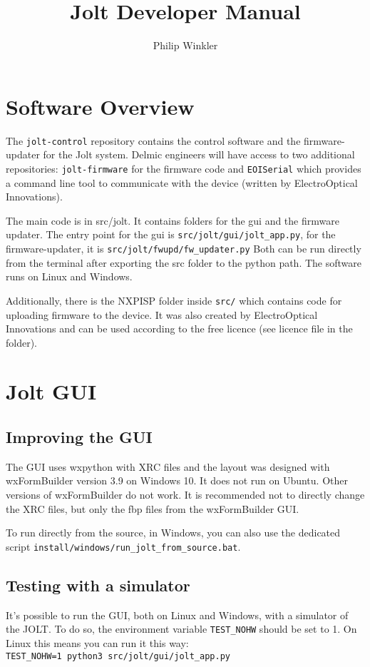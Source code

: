 \documentclass[]{article}
\title{Jolt Developer Manual}
\author{Philip Winkler}
\begin{document}
\maketitle

\section{Software Overview}
The \texttt{jolt-control} repository contains the control software and the firmware-updater for the Jolt system. Delmic engineers will have access to two additional repositories: \texttt{jolt-firmware} for the firmware code and \texttt{EOISerial} which provides a command line tool to communicate with the device (written by ElectroOptical Innovations).

The main code is in src/jolt. It contains folders for the gui and the firmware updater. The entry point for the gui is \texttt{src/jolt/gui/jolt\_app.py}, for the firmware-updater, it is \texttt{src/jolt/fwupd/fw\_updater.py} Both can be run directly from the terminal after exporting the src folder to the python path. The software runs on Linux and Windows.

Additionally, there is the NXPISP folder inside \texttt{src/} which contains code for uploading firmware to the device. It was also created by ElectroOptical Innovations and can be used according to the free licence (see licence file in the folder).

\section{Jolt GUI}
\subsection{Improving the GUI}
The GUI uses wxpython with XRC files and the layout was designed with wxFormBuilder version 3.9 on Windows 10. It does not run on Ubuntu. Other versions of wxFormBuilder do not work. It is recommended not to directly change the XRC files, but only the fbp files from the wxFormBuilder GUI.

To run directly from the source, in Windows, you can also use the dedicated script \texttt{install/windows/run\_jolt\_from\_source.bat}.

\subsection{Testing with a simulator}
It's possible to run the GUI, both on Linux and Windows, with a simulator of the JOLT.
To do so, the environment variable \texttt{TEST\_NOHW} should be set to 1. On Linux
this means you can run it this way:\\
\texttt{TEST\_NOHW=1 python3 src/jolt/gui/jolt\_app.py}
\end{document}
